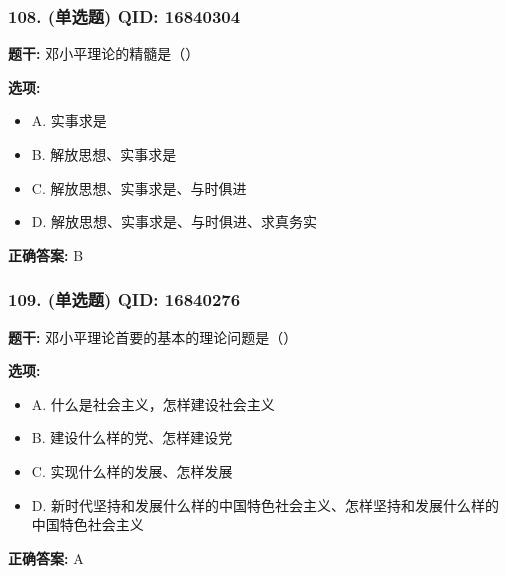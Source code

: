 \documentclass[12pt,UTF8]{ctexart}
\begin{document}
\vspace{0.3em}\hrulefill\vspace{0.7em}

\subsubsection*{108. (单选题) \small QID: 16840304}

\textbf{题干:}
邓小平理论的精髓是（）

\textbf{选项:}
\begin{itemize}[leftmargin=*]

  \item A. 实事求是

  \item B. 解放思想、实事求是

  \item C. 解放思想、实事求是、与时俱进

  \item D. 解放思想、实事求是、与时俱进、求真务实

\end{itemize}

\textbf{正确答案:}
B

\vspace{0.3em}\hrulefill\vspace{0.7em}

\subsubsection*{109. (单选题) \small QID: 16840276}

\textbf{题干:}
邓小平理论首要的基本的理论问题是（）

\textbf{选项:}
\begin{itemize}[leftmargin=*]

  \item A. 什么是社会主义，怎样建设社会主义

  \item B. 建设什么样的党、怎样建设党

  \item C. 实现什么样的发展、怎样发展

  \item D. 新时代坚持和发展什么样的中国特色社会主义、怎样坚持和发展什么样的中国特色社会主义

\end{itemize}

\textbf{正确答案:}
A

\vspace{0.3em}\hrulefill\vspace{0.7em}
\end{document}
